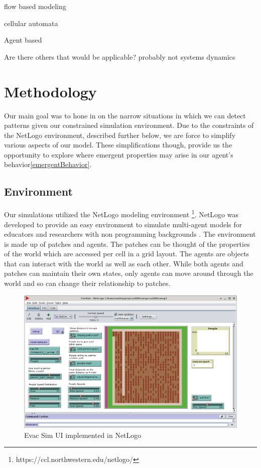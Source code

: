 \documentclass[12pt,letterpaper]{article}
\begin{document}
flow based modeling

cellular automata

Agent based

Are there others that would be applicable?  probably not systems dynamics
\section {Methodology}

Our main goal was to hone in on the narrow situations in which we can detect patterns given our constrained simulation environment.  Due to the constraints of the  NetLogo environment, described further below, we are force to simplify various aspects of our model.  These simplifications though, provide us the opportunity to explore where emergent properties may arise in our agent's behavior\ref{emergentBehavior}.


\subsection{Environment} \label{Environment}

Our simulations utilized the NetLogo modeling environment \footnote{https://ccl.northwestern.edu/netlogo/}.  NetLogo was developed to provide an easy environment to simulate multi-agent models for educators and researchers with non programming backgrounds \cite{netlogo}.  The environment is made up of patches and agents.  The patches can be thought of the properties of the world which are accessed per cell in a grid layout.  The agents are objects that can interact with the world as well as each other.  While both agents and patches can maintain their own states, only agents can move around through the world and so can change their relationship to patches.


\begin{figure}[!h]
  \centering
  \includegraphics[width=.75\linewidth]{./figures/fire_sim_ui.png}
  \caption{Evac Sim UI implemented in NetLogo}
\end{figure}
\end{document}
